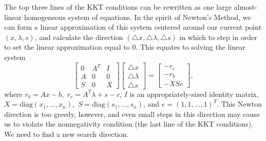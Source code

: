The top three lines of the KKT conditions can be rewritten as one large almost-linear homogeneous system of equations.
In the spirit of
Newton's Method, we can form a linear approximation of this system centered around our current point $(x, \lambda, s)$, and
calculate the direction $(\triangle x, \triangle \lambda, \triangle s)$ in which to step in order to set the linear approximation
equal to 0. This equates to solving the linear system
\begin{equation}
\begin{bmatrix}
0 & A^T & I\\
A & 0 & 0\\
S & 0 & X
\end{bmatrix}
\begin{bmatrix}
\triangle x\\
\triangle \lambda\\
\triangle s
\end{bmatrix}
=
\begin{bmatrix}
-r_c\\
-r_b\\
-XSe
\end{bmatrix},
\label{eq:affine}
\end{equation}
where $r_b = Ax - b,$ $r_c = A^T\lambda + s - c$, $I$ is an appropriately-sized identity matrix, $X = \text{diag}(x_1,\ldots,x_n),$
$S = \text{diag}(s_1,\ldots,s_n)$, and $e = (1,1,\ldots,1)^T$.
This Newton direction is too greedy, however, and even small steps in this direction may cause us to violate the nonnegativity
condition (the last line of the KKT conditions). We need to find a new search direction.

